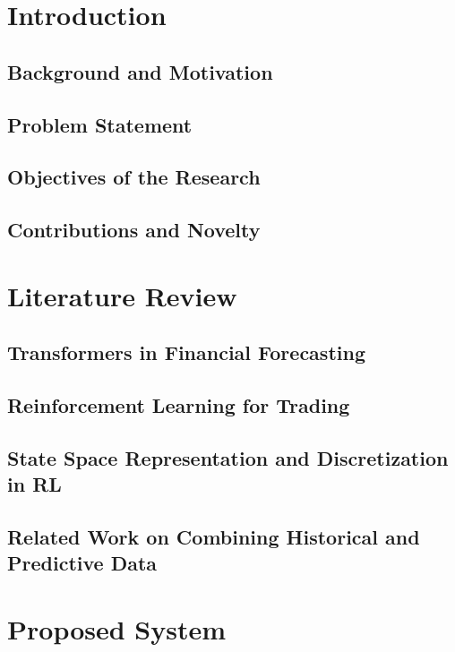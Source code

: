 \documentclass[preprint,review,12pt]{elsarticle}
\begin{document}


\section{Introduction}

\subsection{Background and Motivation}
\subsection{Problem Statement}
\subsection{Objectives of the Research}
\subsection{Contributions and Novelty}
\section{Literature Review}
\subsection{Transformers in Financial Forecasting}
\subsection{Reinforcement Learning for Trading}
\subsection{ State Space Representation and Discretization in RL}
\subsection{Related Work on Combining Historical and Predictive Data}
\section{ Proposed System}
\end{document}
